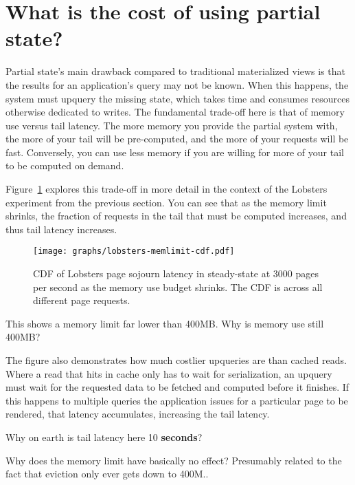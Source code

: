 \section{What is the cost of using partial state?}
\label{s:eval:cost}

Partial state's main drawback compared to traditional materialized views is
that the results for an application's query may not be known. When this happens,
the system must upquery the missing state, which takes time and consumes
resources otherwise dedicated to writes. The fundamental trade-off here is that
of memory use versus tail latency. The more memory you provide the partial
system with, the more of your tail will be pre-computed, and the more of your
requests will be fast. Conversely, you can use less memory if you are willing
for more of your tail to be computed on demand.

Figure~\ref{f:lobsters-mem-latency} explores this trade-off in more detail in
the context of the Lobsters experiment from the previous section. You can see
that as the memory limit shrinks, the fraction of requests in the tail that must
be computed increases, and thus tail latency increases.

\begin{figure}[ht]
  \centering
  \texttt{[image: graphs/lobsters-memlimit-cdf.pdf]}
  \caption{CDF of Lobsters page sojourn latency in steady-state at 3000 pages
  per second as the memory use budget shrinks. The CDF is across all different
  page requests.}
  \label{f:lobsters-mem-latency}
\end{figure}

\begin{inprogress}
  This shows a memory limit far lower than 400MB. Why is memory use still 400MB?
\end{inprogress}

The figure also demonstrates how much costlier upqueries are than cached
reads. Where a read that hits in cache only has to wait for serialization, an
upquery must wait for the requested data to be fetched and computed before it
finishes. If this happens to multiple queries the application issues for a
particular page to be rendered, that latency accumulates, increasing the tail
latency.

\begin{inprogress}
  Why on earth is tail latency here 10 \textbf{seconds}?
\end{inprogress}

\begin{inprogress}
  Why does the memory limit have basically no effect? Presumably related to
  the fact that eviction only ever gets down to 400M..
\end{inprogress}

